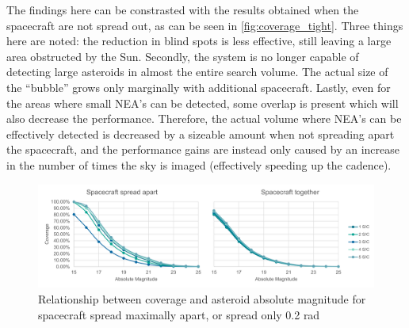 The findings here can be constrasted with the results obtained when the spacecraft are not spread out, as can be seen in \autoref{fig:coverage_tight}. Three things here are noted: the reduction in blind spots is less effective, still leaving a large area obstructed by the Sun. Secondly, the system is no longer capable of detecting large asteroids in almost the entire search volume. The actual size of the ``bubble'' grows only marginally with additional spacecraft. Lastly, even for the areas where small NEA's can be detected, some overlap is present which will also decrease the performance. Therefore, the actual volume where NEA's can be effectively detected is decreased by a sizeable amount when not spreading apart the spacecraft, and the performance gains are instead only caused by an increase in the number of times the sky is imaged (effectively speeding up the cadence).\\

\begin{figure}[htbp]
 \centering
 \includegraphics[width=1.0\textwidth]{img/spread_coverage.pdf}
 \caption{Relationship between coverage and asteroid absolute magnitude for spacecraft spread maximally apart, or spread only 0.2 rad}
 \label{fig:spread_coverage}
\end{figure}

